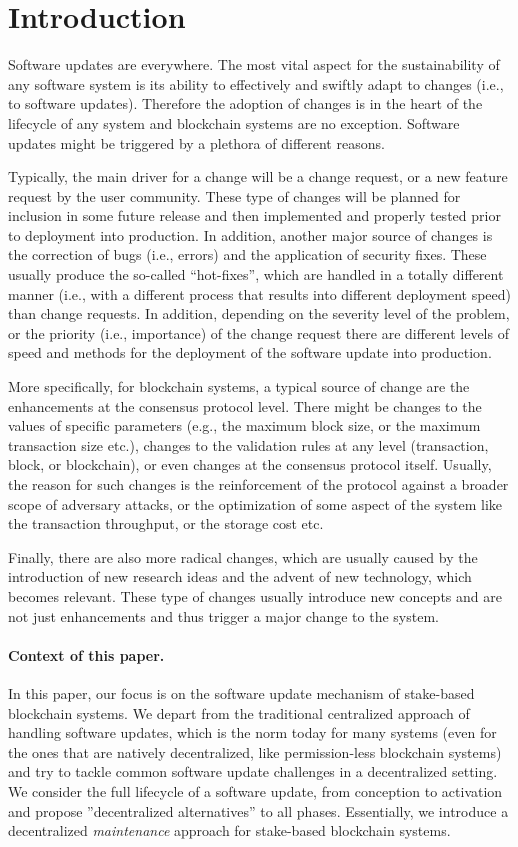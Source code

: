 \section{Introduction}
Software updates are everywhere. The most vital aspect for the sustainability of any software system is its ability to effectively and swiftly adapt to changes (i.e., to software updates). Therefore the adoption of changes is in the heart of the lifecycle of any system and blockchain systems are no exception. Software updates might be triggered by a plethora of different reasons. 

Typically, the main driver for a change will be a change request, or a new feature request by the user community. These type of changes will be planned for inclusion in some future release and then implemented and properly tested prior to deployment into production. In addition, another major source of changes is the correction of bugs (i.e., errors) and the application of security fixes. These usually produce the so-called \enquote{hot-fixes}, which are handled in a totally different manner (i.e., with a different process that results into different deployment speed) than change requests. In addition, depending on the severity level of the problem, or the priority (i.e., importance) of the change request there are different levels of speed and methods for the deployment of the software update into production. 

More specifically, for blockchain systems, a typical source of change are the enhancements at the consensus protocol level. There might be changes to the values of specific parameters (e.g., the maximum block size, or the maximum transaction size etc.), changes to the validation rules at any level (transaction, block, or blockchain), or even changes at the consensus protocol itself. Usually, the reason for such changes is the reinforcement of the protocol against a broader scope of adversary attacks, or the optimization of some aspect of the system like the transaction throughput, or the storage cost etc.

Finally, there are also more radical changes, which are usually caused by the introduction of new research ideas  and the advent of new technology, which becomes relevant. These type of changes usually introduce new concepts and are not just enhancements and thus trigger a major change to the system.

\paragraph{Context of this paper.} 
In this paper, our focus is on the software update mechanism of stake-based blockchain systems. We depart from the traditional centralized approach of handling software updates, which is the norm today for many systems (even for the ones that are natively decentralized, like permission-less blockchain systems) and try to tackle common software update challenges in a decentralized setting. We consider the full lifecycle of a software update, from conception to activation and propose ''decentralized alternatives'' to all phases. Essentially, we introduce a decentralized \emph{maintenance} approach for stake-based blockchain systems.

